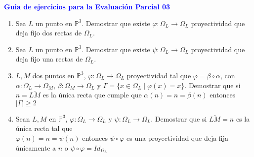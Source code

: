 \documentclass[12pts]{report}
\newcommand{\p}{\mathbb P}
\begin{document}
\begin{center}
\textcolor{blue}{\textbf{\large Guia de ejercicios para la Evaluación Parcial 03 }}\\
\vspace{0.5 cm}
\end{center}


\begin{center}
\end{center}

\begin{enumerate}
\item Sea $L$ un punto en $\p^3$. Demostrar que existe $\varphi : \Omega_L \to \Omega_L$ proyectividad que deja fijo dos rectas de $\Omega_L$.

\item Sea $L$ un punto en $\p^3$. Demostrar que existe $\psi : \Omega_L \to \Omega_L$ proyectividad que deja fijo una rectas de $\Omega_L$.

\item $L, M$ dos puntos en $\p^3$, $\varphi: \Omega_L\to \Omega_L$ proyectividad tal que  $\varphi =\beta\circ\alpha$, con $\alpha: \Omega_L\to\Omega_M$, $\beta: \Omega_M\to \Omega_L$ y $\Gamma = \{x\in\Omega_L\; | \; \varphi(x)= x\}$.
Demostrar que si $n=\overline{LM}$ es la única recta que cumple que $\alpha(n)=n=\beta(n)$  entonces $|\Gamma|\geq 2$

\item Sean $L, M$ en $\p^3$, $\varphi:\Omega_{L}\to\Omega_{L}$ y $\psi: \Omega_{L}\to \Omega_L$. Demostrar que si  $\overline{LM}=n$ es la única recta tal que \\
$\varphi(n)=n=\psi(n)$ entonces $\psi\circ\varphi$ es una proyectividad que deja fija únicamente a $n$ o $\psi\circ\varphi = Id_{\Omega_L}$


\end{enumerate}
\end{document}
